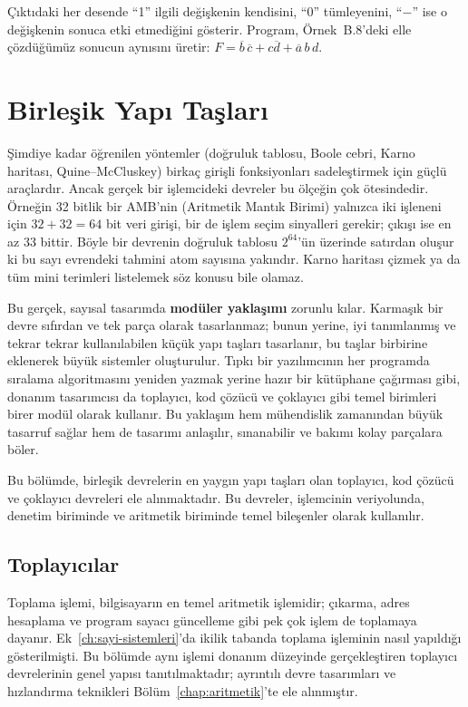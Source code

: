 \noindent Çıktıdaki her desende ``1'' ilgili değişkenin kendisini, ``0'' tümleyenini, ``$-$'' ise o değişkenin sonuca etki etmediğini gösterir. Program, Örnek~B.8'deki elle çözdüğümüz sonucun aynısını üretir: $F = \overline{b}\,\overline{c} + c\overline{d} + \overline{a}\,b\,d$.


\section{Birleşik Yapı Taşları}

Şimdiye kadar öğrenilen yöntemler (doğruluk tablosu, Boole cebri, Karno haritası, Quine--McCluskey) birkaç girişli fonksiyonları sadeleştirmek için güçlü araçlardır. Ancak gerçek bir işlemcideki devreler bu ölçeğin çok ötesindedir. Örneğin 32 bitlik bir AMB'nin (Aritmetik Mantık Birimi) yalnızca iki işleneni için $32 + 32 = 64$ bit veri girişi, bir de işlem seçim sinyalleri gerekir; çıkışı ise en az 33 bittir. Böyle bir devrenin doğruluk tablosu $2^{64}$'ün üzerinde satırdan oluşur ki bu sayı evrendeki tahmini atom sayısına yakındır. Karno haritası çizmek ya da tüm mini terimleri listelemek söz konusu bile olamaz.

Bu gerçek, sayısal tasarımda \textbf{modüler yaklaşımı} zorunlu kılar. Karmaşık bir devre sıfırdan ve tek parça olarak tasarlanmaz; bunun yerine, iyi tanımlanmış ve tekrar tekrar kullanılabilen küçük yapı taşları tasarlanır, bu taşlar birbirine eklenerek büyük sistemler oluşturulur. Tıpkı bir yazılımcının her programda sıralama algoritmasını yeniden yazmak yerine hazır bir kütüphane çağırması gibi, donanım tasarımcısı da toplayıcı, kod çözücü ve çoklayıcı gibi temel birimleri birer modül olarak kullanır. Bu yaklaşım hem mühendislik zamanından büyük tasarruf sağlar hem de tasarımı anlaşılır, sınanabilir ve bakımı kolay parçalara böler.

Bu bölümde, birleşik devrelerin en yaygın yapı taşları olan toplayıcı, kod çözücü ve çoklayıcı devreleri ele alınmaktadır. Bu devreler, işlemcinin veriyolunda, denetim biriminde ve aritmetik biriminde temel bileşenler olarak kullanılır.

\subsection{Toplayıcılar}
\label{sec:toplayicilar}

Toplama işlemi, bilgisayarın en temel aritmetik işlemidir; çıkarma, adres hesaplama ve program sayacı güncelleme gibi pek çok işlem de toplamaya dayanır. Ek~\ref{ch:sayi-sistemleri}'da ikilik tabanda toplama işleminin nasıl yapıldığı gösterilmişti. Bu bölümde aynı işlemi donanım düzeyinde gerçekleştiren toplayıcı devrelerinin genel yapısı tanıtılmaktadır; ayrıntılı devre tasarımları ve hızlandırma teknikleri Bölüm~\ref{chap:aritmetik}'te ele alınmıştır.

